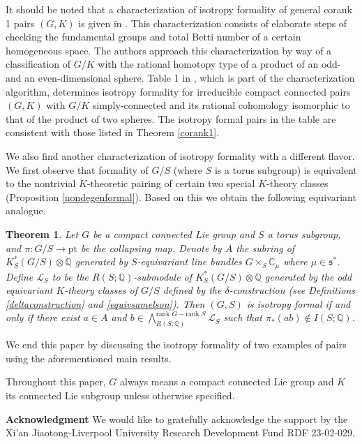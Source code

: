 \documentclass[11pt]{amsart}
\theoremstyle{plain}
\newtheorem{theorem}{Theorem}[section]
\theoremstyle{definition}
\begin{document}
It should be noted that a characterization of isotropy formality of general corank 1 pairs $(G, K)$ is given in \cite{CH}. This characterization consists of elaborate steps of checking the fundamental groups and total Betti number of a certain homogeneous space. The authors approach this characterization by way of a classification of $G/K$ with the rational homotopy type of a product of an odd- and an even-dimensional sphere. Table 1 in \cite{CH}, which is part of the characterization algorithm, determines isotropy formality for  irreducible compact connected pairs $(G, K)$ with $G/K$ simply-connected and its rational cohomology isomorphic to that of the product of two spheres. The isotropy formal pairs in the table are consistent with those listed in Theorem \ref{corank1}. %

We also find another characterization of isotropy formality with a different flavor. We first observe that formality of $G/S$ (where $S$ is a torus subgroup) is equivalent to the nontrivial $K$-theoretic pairing of certain two special $K$-theory classes (Proposition \ref{nondegenformal}). Based on this we obtain the following equivariant analogue. 
\begin{theorem}\label{indexthry}
	Let $G$ be a compact connected Lie group and $S$ a torus subgroup, and $\pi: G/S\to\text{pt}$ be the collapsing map. Denote by $A$ the subring of $K_S^*(G/S)\otimes\mathbb{Q}$ generated by $S$-equivariant line bundles $G\times_S\mathbb{C}_\mu$ where $\mu\in\mathfrak{s}^*$. Define $\mathcal{L}_S$ to be the $R(S; \mathbb{Q})$-submodule of $K_S^*(G/S)\otimes\mathbb{Q}$ generated by the odd equivariant $K$-theory classes of $G/S$ defined by the $\delta$-construction (see Definitions \ref{deltaconstruction} and \ref{equivsamelson}). Then $(G, S)$ is isotropy formal if and only if there exist $a\in A$ and $b\in\bigwedge\nolimits_{R(S; \mathbb{Q})}^{\text{rank }G-\text{rank }S}\mathcal{L}_S$ such that $\pi_*(ab)\notin I(S; \mathbb{Q})$. 
\end{theorem}
We end this paper by discussing the isotropy formality of two examples of pairs using the aforementioned main results.

Throughout this paper, $G$ always means a compact connected Lie group and $K$ its connected Lie subgroup unless otherwise specified. 

\textbf{Acknowledgment }We would like to gratefully acknowledge the support by the Xi'an Jiaotong-Liverpool University Research Development Fund RDF 23-02-029.
\end{document}
